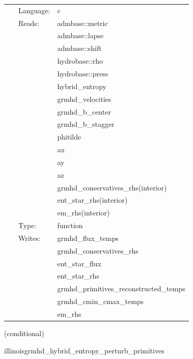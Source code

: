  \begin{tabular*}{160mm}{cll} 
~ & Language:  & c \\ 
~ & Reads:  & admbase::metric \\ 
~& ~ &admbase::lapse\\ 
~& ~ &admbase::shift\\ 
~& ~ &hydrobase::rho\\ 
~& ~ &hydrobase::press\\ 
~& ~ &hybrid\_entropy\\ 
~& ~ &grmhd\_velocities\\ 
~& ~ &grmhd\_b\_center\\ 
~& ~ &grmhd\_b\_stagger\\ 
~& ~ &phitilde\\ 
~& ~ &ax\\ 
~& ~ &ay\\ 
~& ~ &az\\ 
~& ~ &grmhd\_conservatives\_rhs(interior)\\ 
~& ~ &ent\_star\_rhs(interior)\\ 
~& ~ &em\_rhs(interior)\\ 
~ & Type:  & function \\ 
~ & Writes:  & grmhd\_flux\_temps \\ 
~& ~ &grmhd\_conservatives\_rhs\\ 
~& ~ &ent\_star\_flux\\ 
~& ~ &ent\_star\_rhs\\ 
~& ~ &grmhd\_primitives\_reconstructed\_temps\\ 
~& ~ &grmhd\_cmin\_cmax\_temps\\ 
~& ~ &em\_rhs\\ 
\end{tabular*} 


\vspace{5mm}

   (conditional) 

\hspace{5mm} illinoisgrmhd\_hybrid\_entropy\_perturb\_primitives 

\hspace{5mm}{\it entropy+hybrid version of illinoisgrmhd\_perturb\_primitives } 


\hspace{5mm}

